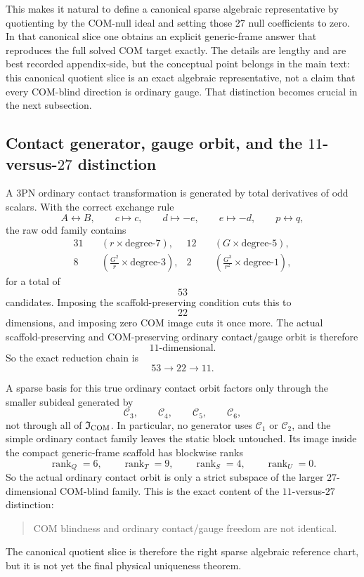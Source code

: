 \documentclass[11pt]{article}
\begin{document}
This makes it natural to define a canonical sparse algebraic representative by
quotienting by the COM-null ideal and setting those $27$ null coefficients to
zero.  In that canonical slice one obtains an explicit generic-frame answer that
reproduces the full solved COM target exactly.  The details are lengthy and are
best recorded appendix-side, but the conceptual point belongs in the main text:
this canonical quotient slice is an exact algebraic representative, not a claim
that every COM-blind direction is ordinary gauge.  That distinction becomes
crucial in the next subsection.

\subsection{Contact generator, gauge orbit, and the \texorpdfstring{$11$}{11}-versus-\texorpdfstring{$27$}{27} distinction}
\label{sec:compmass-gauge-orbit}

A $3$PN ordinary contact transformation is generated by total derivatives of odd
scalars.  With the correct exchange rule
\[
A\leftrightarrow B,
\qquad
c\mapsto c,
\qquad
d\mapsto -e,
\qquad
e\mapsto -d,
\qquad
p\leftrightarrow q,
\]
the raw odd family contains
\[
\begin{aligned}
31&\quad (r\times\text{degree-}7),
& 12&\quad (G\times\text{degree-}5),
\\
8&\quad \left(\frac{G^2}{r}\times\text{degree-}3\right),
& 2&\quad \left(\frac{G^3}{r^2}\times\text{degree-}1\right),
\end{aligned}
\]
for a total of
\[
\boxed{53}
\]
candidates.  Imposing the scaffold-preserving condition cuts this to
\[
\boxed{22}
\]
dimensions, and imposing zero COM image cuts it once more.  The actual
scaffold-preserving and COM-preserving ordinary contact/gauge orbit is therefore
\[
\boxed{11\text{-dimensional}.}
\]
So the exact reduction chain is
\[
53\longrightarrow 22\longrightarrow 11.
\]

A sparse basis for this true ordinary contact orbit factors only through the
smaller subideal generated by
\[
\mathcal C_3,\qquad \mathcal C_4,\qquad \mathcal C_5,\qquad \mathcal C_6,
\]
not through all of $\mathfrak I_{\rm COM}$.  In particular, no generator uses
$\mathcal C_1$ or $\mathcal C_2$, and the simple ordinary contact family leaves
the static block untouched.  Its image inside the compact generic-frame scaffold
has blockwise ranks
\[
\boxed{\operatorname{rank}_Q=6,
\qquad
\operatorname{rank}_T=9,
\qquad
\operatorname{rank}_S=4,
\qquad
\operatorname{rank}_U=0.}
\]
So the actual ordinary contact orbit is only a strict subspace of the larger
$27$-dimensional COM-blind family.  This is the exact content of the
$11$-versus-$27$ distinction:
\begin{quote}
COM blindness and ordinary contact/gauge freedom are not identical.
\end{quote}
The canonical quotient slice is therefore the right sparse algebraic reference
chart, but it is not yet the final physical uniqueness theorem.
\end{document}
